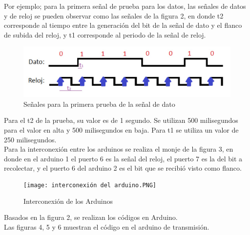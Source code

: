 \documentclass{article}
\begin{document}
Por ejemplo; para la primera señal de prueba para los datos, las señales de datos y de reloj se pueden observar como las señales de la figura 2, en donde t2 corresponde al tiempo entre la generación del bit de la señal de dato y el flanco de subida del reloj, y t1 corresponde al periodo de la señal de reloj.\\

\begin{figure}[h]
\includegraphics[width=12cm]{Prueba_datos_y_clock.jpeg}
\centering
\caption{Señales para la primera prueba de la señal de dato}
\label{fig:Prueba_datos_y_clock.jpeg}
\end{figure}

Para el t2 de la prueba, su valor es de 1 segundo. Se utilizan 500 milisegundos para el valor en alta y 500 milisegundos en baja. Para t1 se utiliza un valor de 250 milisegundos.\\


Para la interconexión entre los arduinos se realiza el monje de la figura 3, en donde en el arduino 1 el puerto 6 es la señal del reloj, el puerto 7 es la del bit a recolectar, y el puerto 6 del arduino 2 es el bit que se recibió visto como flanco.
\newpage


\begin{figure}[h]
\texttt{[image: interconexión del arduino.PNG]}
\centering
\caption{Interconexión de los Arduinos}
\label{fig:interconexión del arduino.PNG}
\end{figure}

Basados en la figura 2, se realizan los códigos en Arduino.\\


Las figuras 4, 5 y 6 muestran el código en el arduino de transmisión.\\

\newpage
\end{document}
